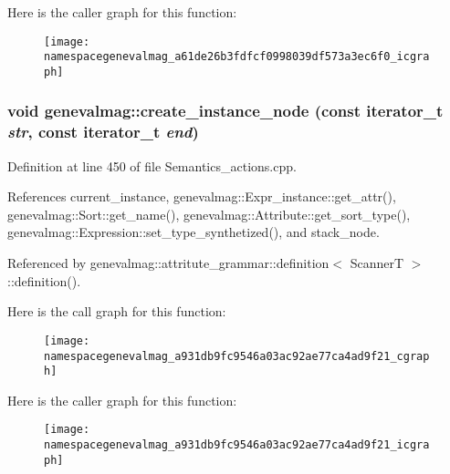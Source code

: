 Here is the caller graph for this function:\nopagebreak
\begin{figure}[H]
\begin{center}
\leavevmode
\texttt{[image: namespacegenevalmag\_a61de26b3fdfcf0998039df573a3ec6f0\_icgraph]}
\end{center}
\end{figure}


\hypertarget{namespacegenevalmag_a931db9fc9546a03ac92ae77ca4ad9f21}{
\subsubsection[{create\_\-instance\_\-node}]{\setlength{\rightskip}{0pt plus 5cm}void genevalmag::create\_\-instance\_\-node (const iterator\_\-t {\em str}, \/  const iterator\_\-t {\em end})}}
\label{namespacegenevalmag_a931db9fc9546a03ac92ae77ca4ad9f21}


Definition at line 450 of file Semantics\_\-actions.cpp.



References current\_\-instance, genevalmag::Expr\_\-instance::get\_\-attr(), genevalmag::Sort::get\_\-name(), genevalmag::Attribute::get\_\-sort\_\-type(), genevalmag::Expression::set\_\-type\_\-synthetized(), and stack\_\-node.



Referenced by genevalmag::attritute\_\-grammar::definition$<$ ScannerT $>$::definition().



Here is the call graph for this function:\nopagebreak
\begin{figure}[H]
\begin{center}
\leavevmode
\texttt{[image: namespacegenevalmag\_a931db9fc9546a03ac92ae77ca4ad9f21\_cgraph]}
\end{center}
\end{figure}




Here is the caller graph for this function:\nopagebreak
\begin{figure}[H]
\begin{center}
\leavevmode
\texttt{[image: namespacegenevalmag\_a931db9fc9546a03ac92ae77ca4ad9f21\_icgraph]}
\end{center}
\end{figure}


